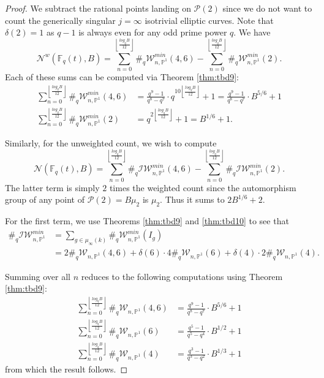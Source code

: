 \documentclass[a4paper,12pt]{amsart}
\theoremstyle{definition}
\newcommand{\bP}{\mathbb{P}}
\newcommand{\cW}{\mathcal{W}}
\newcommand{\cP}{\mathcal{P}}
\newcommand{\cI}{\mathcal{I}}
\newcommand{\Pc}{\mathcal{P}}
\newcommand{\Nc}{\mathcal{N}}
\newcommand{\Fb}{\mathbb{F}}
\begin{document}
	\begin{proof} 
		
		We subtract the rational points landing on $\Pc(2)$ since we do not want to count the generically singular $j = \infty$ isotrivial elliptic curves. Note that $\delta(2) = 1$ as $q-1$ is always even for any odd prime power $q$. We have
		$$
		\Nc^w(\Fb_q(t), B) = \sum_{n = 0}^{\left \lfloor \frac{log_q B}{12} \right \rfloor} \#_q \cW_{n, \bP^1}^{min}(4,6) - \sum_{n = 0}^{\left \lfloor \frac{log_q B}{12} \right \rfloor} \#_q\cW_{n, \bP^1}^{min}(2).
		$$
		Each of these sums can be computed via Theorem \ref{thm:tbd9}:
		\begin{align*}
			\sum_{n = 0}^{\left \lfloor \frac{log_q B}{12} \right \rfloor} \#_q \cW^{min}_{n, \bP^1}(4,6) &= \frac{q^9 - 1}{q^8 - q^7} \cdot q^{10\left \lfloor \frac{log_q B}{12} \right \rfloor} + 1 = \frac{q^9 - 1}{q^8 - q^7} \cdot B^{5/6} + 1 \\
			\sum_{n = 0}^{\left \lfloor \frac{log_q B}{12} \right \rfloor} \#_q \cW^{min}_{n, \bP^1}(2) &= q^{2\left \lfloor \frac{log_q B}{12} \right \rfloor} + 1 = B^{1/6} + 1.
		\end{align*}
		
		Similarly, for the unweighted count, we wish to compute
		$$
		\Nc(\Fb_q(t), B) = \sum_{n = 0}^{\left \lfloor \frac{log_q B}{12} \right \rfloor} \#_q \cI\cW^{min}_{n, \bP^1}(4,6) - \sum_{n = 0}^{\left \lfloor \frac{log_q B}{12} \right \rfloor} \#_q \cI\cW^{min}_{n, \bP^1}(2). 
		$$
		The latter term is simply $2$ times the weighted count since the automorphism group of any point of $\cP(2) = B\mu_2$ is $\mu_2$. Thus it sums to $2B^{1/6} + 2$. 
		
		For the first term, we use Theorems \ref{thm:tbd9} and \ref{thm:tbd10} to see that 
		\begin{align*}
			\#_q\cI \cW_{n,\bP^1}^{min} &= \sum_{g \in \mu_{\infty}(k)} \#_q\cW_{n,\bP^1}^{min}(I_g) \\ &= 2\#_q\cW_{n,\bP^1}(4,6) + \delta(6)\cdot 4 \#_q\cW_{n,\bP^1}(6) + \delta(4) \cdot 2 \#_q \cW_{n,\bP^1}(4).
		\end{align*}
		
		\noindent Summing over all $n$ reduces to the following computations using Theorem \ref{thm:tbd9}:
		\begin{align*}
			\sum_{n = 0}^{\left \lfloor \frac{log_q B}{12} \right \rfloor} \#_q\cW_{n,\bP^1}(4,6) &= \frac{q^9 - 1}{q^8 - q^7} \cdot B^{5/6} + 1 \\
			\sum_{n = 0}^{\left \lfloor \frac{log_q B}{12} \right \rfloor} \#_q\cW_{n,\bP^1}(6) &= \frac{q^5 - 1}{q^5 - q^4} \cdot B^{1/2} + 1 \\ 
			\sum_{n = 0}^{\left \lfloor \frac{log_q B}{12} \right \rfloor} \#_q\cW_{n,\bP^1}(4) &= \frac{q^3 - 1}{q^3 - q^2} \cdot B^{1/3} + 1
		\end{align*}
		from which the result follows. 
		

\end{proof}
\end{document}
